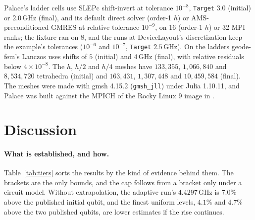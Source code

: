 \documentclass{anvil-paper}
\begin{document}
Palace's ladder cells use SLEPc shift-invert at tolerance $10^{-8}$,
\texttt{Target} $3.0$ (initial) or $2.0$\,GHz (final), and its default
direct solver (order-1 $h$) or AMS-preconditioned GMRES at relative
tolerance $10^{-9}$, on 16 (order-1 $h$) or 32 MPI ranks; the fixture ran
on 8, and the runs at DeviceLayout's discretization keep the example's
tolerances ($10^{-6}$ and $10^{-7}$, \texttt{Target} $2.5$\,GHz). On the ladders geode-fem's
Lanczos uses shifts of $5$ (initial) and $4$\,GHz (final), with relative
residuals below $4\times10^{-8}$.
The $h$, $h/2$ and $h/4$ meshes have $133{,}355$, $1{,}066{,}840$ and
$8{,}534{,}720$ tetrahedra (initial) and $163{,}431$, $1{,}307{,}448$ and
$10{,}459{,}584$ (final). The meshes were made
with gmsh 4.15.2 (\texttt{gmsh\_jll}) under Julia 1.10.11, and Palace was
built against the MPICH of the Rocky Linux 9 image in
.

\section{Discussion}
\label{sec:discussion}

\paragraph{What is established, and how.}
Table~\ref{tab:tiers} sorts the results by the kind of evidence behind
them. The brackets are the only bounds, and the cap follows from a bracket
only under a circuit model. Without extrapolation, the adaptive run's $4.4297$\,GHz is $7.0\%$ above the
published initial qubit, and the finest uniform levels, $4.1\%$ and $4.7\%$
above the two published qubits, are lower estimates if the rise continues.
\end{document}
